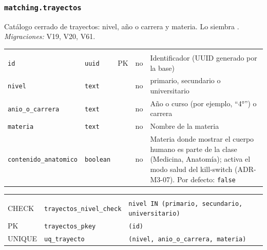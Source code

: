 \subsubsection{\texorpdfstring{\texttt{matching.trayectos}}{matching.trayectos}}\label{dd:matching.trayectos}

Catálogo cerrado de trayectos: nivel, año o carrera y materia. Lo siembra . \emph{Migraciones:} V19, V20, V61.

{\small
\begin{xltabular}{\textwidth}{@{}>{\raggedright\arraybackslash}p{3.6cm} >{\raggedright\arraybackslash}p{2.3cm} >{\raggedright\arraybackslash}p{1cm} >{\centering\arraybackslash}p{0.85cm} L@{}}
    \toprule
     &  &  &  &  \\
    \midrule
    \endfirsthead
    \toprule
     &  &  &  &  \\
    \midrule
    \endhead
    \bottomrule
    \endfoot
    \texttt{id} & \texttt{uuid} & PK & no & Identificador (UUID generado por la base) \\
    \texttt{nivel} & \texttt{text} &  & no & primario, secundario o universitario \\
    \texttt{anio\_\allowbreak{}o\_\allowbreak{}carrera} & \texttt{text} &  & no & Año o curso (por ejemplo, ``4°'') o carrera \\
    \texttt{materia} & \texttt{text} &  & no & Nombre de la materia \\
    \texttt{contenido\_\allowbreak{}anatomico} & \texttt{boolean} &  & no & Materia donde mostrar el cuerpo humano es parte de la clase (Medicina, Anatomía); activa el modo salud del kill-switch (ADR-M3-07). Por defecto: \texttt{false} \\
\end{xltabular}
}

{\small
\begin{xltabular}{\textwidth}{@{}>{\raggedright\arraybackslash}p{1.7cm} >{\raggedright\arraybackslash}p{4.6cm} L@{}}
    \toprule
     &  &  \\
    \midrule
    \endfirsthead
    \toprule
     &  &  \\
    \midrule
    \endhead
    \bottomrule
    \endfoot
    CHECK & \texttt{trayectos\_\allowbreak{}nivel\_\allowbreak{}check} & \texttt{nivel IN (\allowbreak{}\textquotesingle{}primario\textquotesingle{},\allowbreak{} \textquotesingle{}secundario\textquotesingle{},\allowbreak{} \textquotesingle{}universitario\textquotesingle{})} \\
    PK & \texttt{trayectos\_\allowbreak{}pkey} & \texttt{(\allowbreak{}id)} \\
    UNIQUE & \texttt{uq\_\allowbreak{}trayecto} & \texttt{(\allowbreak{}nivel,\allowbreak{} anio\_\allowbreak{}o\_\allowbreak{}carrera,\allowbreak{} materia)} \\
\end{xltabular}
}


